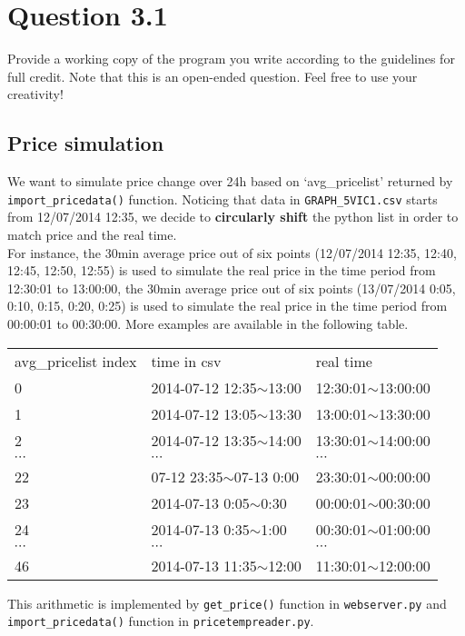 \documentclass{article}
\newenvironment{homeworkProblem}[1]{
	\section*{#1}
	}{
}
\newenvironment{homeworkSection}[1]{
	\subsection*{#1}
	}{
}
\begin{document}

\begin{homeworkProblem}{Question 3.1}
Provide a working copy of the program you write according to the guidelines for full credit. Note that this is an open-ended question. Feel free to use your creativity!

\begin{homeworkSection}{Price simulation}
We want to simulate price change over 24h based on `avg\_pricelist' returned by \texttt{import\_pricedata()} function. Noticing that data in \texttt{GRAPH\_5VIC1.csv} starts from 12/07/2014 12:35, we decide to \textbf{circularly shift} the python list in order to match price and the real time.\\

For instance, the 30min average price out of six points (12/07/2014 12:35, 12:40, 12:45, 12:50, 12:55) is used to simulate the real price in the time period from 12:30:01 to 13:00:00, the 30min average price out of six points (13/07/2014 0:05, 0:10, 0:15, 0:20, 0:25) is used to simulate the real price in the time period from 00:00:01 to 00:30:00. More examples are available in the following table.
\begin{table}[!hbp]
\centering
\begin{tabu} to 0.8\textwidth {X[c] X[l] X[l]}
avg\_pricelist index &time in csv &real time\\
0  & 2014-07-12 12:35$\sim$13:00 & 12:30:01$\sim$13:00:00 \\
1  & 2014-07-12 13:05$\sim$13:30 & 13:00:01$\sim$13:30:00 \\
2  & 2014-07-12 13:35$\sim$14:00 & 13:30:01$\sim$14:00:00 \\
$\cdots$ &$\cdots$ &$\cdots$\\
22 & 07-12 23:35$\sim$07-13 0:00  & 23:30:01$\sim$00:00:00 \\
23 & 2014-07-13 0:05$\sim$0:30   & 00:00:01$\sim$00:30:00 \\
24 & 2014-07-13 0:35$\sim$1:00   & 00:30:01$\sim$01:00:00 \\
$\cdots$ &$\cdots$ &$\cdots$\\
46 & 2014-07-13 11:35$\sim$12:00 & 11:30:01$\sim$12:00:00
\end{tabu}
\end{table}

This arithmetic is implemented by \texttt{get\_price()} function in \texttt{webserver.py} and \texttt{import\_pricedata()} function in \texttt{pricetempreader.py}.
\end{homeworkSection}


\end{homeworkProblem}
\end{document}
